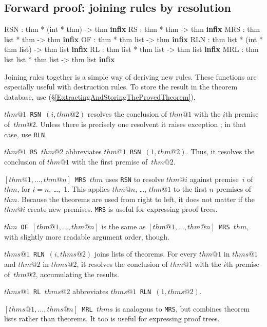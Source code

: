 \subsection{Forward proof: joining rules by resolution}
\begin{ttbox} 
RSN : thm * (int * thm) -> thm                 \hfill\textbf{infix}
RS  : thm * thm -> thm                         \hfill\textbf{infix}
MRS : thm list * thm -> thm                    \hfill\textbf{infix}
OF  : thm * thm list -> thm                    \hfill\textbf{infix}
RLN : thm list * (int * thm list) -> thm list  \hfill\textbf{infix}
RL  : thm list * thm list -> thm list          \hfill\textbf{infix}
MRL : thm list list * thm list -> thm list     \hfill\textbf{infix}
\end{ttbox}
Joining rules together is a simple way of deriving new rules.  These
functions are especially useful with destruction rules.  To store
the result in the theorem database, use 
(\S\ref{ExtractingAndStoringTheProvedTheorem}). 
\begin{ttdescription}
\item[\tt$thm@1$ RSN $(i,thm@2)$]  
  resolves the conclusion of $thm@1$ with the $i$th premise of~$thm@2$.
  Unless there is precisely one resolvent it raises exception
  ; in that case, use {\tt RLN}.

\item[\tt$thm@1$ RS $thm@2$]  
abbreviates \hbox{\tt$thm@1$ RSN $(1,thm@2)$}.  Thus, it resolves the
conclusion of $thm@1$ with the first premise of~$thm@2$.

\item[\tt {$[thm@1,\ldots,thm@n]$} MRS $thm$]  
  uses {\tt RSN} to resolve $thm@i$ against premise~$i$ of $thm$, for
  $i=n$, \ldots,~1.  This applies $thm@n$, \ldots, $thm@1$ to the first $n$
  premises of $thm$.  Because the theorems are used from right to left, it
  does not matter if the $thm@i$ create new premises.  {\tt MRS} is useful
  for expressing proof trees.
  
\item[\tt {$thm$ OF $[thm@1,\ldots,thm@n]$}]  is the same as
  \texttt{$[thm@1,\ldots,thm@n]$ MRS $thm$}, with slightly more readable
  argument order, though.

\item[\tt$thms@1$ RLN $(i,thms@2)$]  
  joins lists of theorems.  For every $thm@1$ in $thms@1$ and $thm@2$ in
  $thms@2$, it resolves the conclusion of $thm@1$ with the $i$th premise
  of~$thm@2$, accumulating the results. 

\item[\tt$thms@1$ RL $thms@2$]  
abbreviates \hbox{\tt$thms@1$ RLN $(1,thms@2)$}. 

\item[\tt {$[thms@1,\ldots,thms@n]$} MRL $thms$]  
is analogous to {\tt MRS}, but combines theorem lists rather than theorems.
It too is useful for expressing proof trees.
\end{ttdescription}


